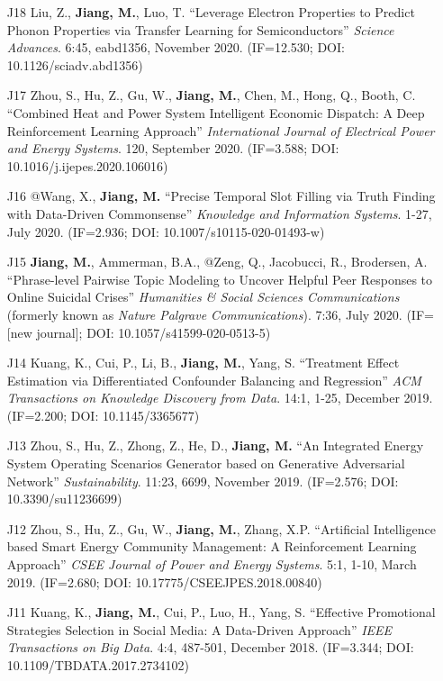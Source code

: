 \documentclass[10pt]{article}
\newenvironment{myindentpar}[1]%
{\begin{list}{}%
         {\setlength{\leftmargin}{#1}}%
         \item[]%
}
{\end{list}}
\newcounter{list}
\begin{document}
\begin{myindentpar}{0.00cm}
\begin{enumerate}[leftmargin=.5cm]
\item[J18] Liu, Z., \textbf{Jiang, M.}, Luo, T. ``Leverage Electron Properties to Predict Phonon Properties via Transfer Learning for Semiconductors'' \textit{Science Advances}. 6:45, eabd1356, November 2020. (IF=12.530; DOI: 10.1126/sciadv.abd1356)
	
\item[J17] Zhou, S., Hu, Z., Gu, W., \textbf{Jiang, M.}, Chen, M., Hong, Q., Booth, C. ``Combined Heat and Power System Intelligent Economic Dispatch: A Deep Reinforcement Learning Approach'' \textit{International Journal of Electrical Power and Energy Systems}. 120, September 2020. (IF=3.588; DOI: 10.1016/j.ijepes.2020.106016)

\item[J16] @Wang, X., \textbf{Jiang, M.} ``Precise Temporal Slot Filling via Truth Finding with Data-Driven Commonsense'' \textit{Knowledge and Information Systems}. 1-27, July 2020. (IF=2.936; DOI: 10.1007/s10115-020-01493-w)

\item[J15] \textbf{Jiang, M.}, Ammerman, B.A., @Zeng, Q., Jacobucci, R., Brodersen, A. ``Phrase-level Pairwise Topic Modeling to Uncover Helpful Peer Responses to Online Suicidal Crises'' \textit{Humanities \& Social Sciences Communications} (formerly known as \textit{Nature Palgrave Communications}). 7:36, July 2020. (IF=[new journal]; DOI: 10.1057/s41599-020-0513-5)

\item[J14] Kuang, K., Cui, P., Li, B., \textbf{Jiang, M.}, Yang, S. ``Treatment Effect Estimation via Differentiated Confounder Balancing and Regression'' \textit{ACM Transactions on Knowledge Discovery from Data}. 14:1, 1-25, December 2019. (IF=2.200; DOI: 10.1145/3365677)
	
\item[J13] Zhou, S., Hu, Z., Zhong, Z., He, D., \textbf{Jiang, M.} ``An Integrated Energy System Operating Scenarios Generator based on Generative Adversarial Network'' \textit{Sustainability}. 11:23, 6699, November 2019. (IF=2.576; DOI: 10.3390/su11236699)

\item[J12] Zhou, S., Hu, Z., Gu, W., \textbf{Jiang, M.}, Zhang, X.P. ``Artificial Intelligence based Smart Energy Community Management: A Reinforcement Learning Approach'' \textit{CSEE Journal of Power and Energy Systems}. 5:1, 1-10, March 2019. (IF=2.680; DOI: 10.17775/CSEEJPES.2018.00840)

\item[J11] Kuang, K., \textbf{Jiang, M.}, Cui, P., Luo, H., Yang, S. ``Effective Promotional Strategies Selection in Social Media: A Data-Driven Approach'' \textit{IEEE Transactions on Big Data}. 4:4, 487-501, December 2018. (IF=3.344; DOI: 10.1109/TBDATA.2017.2734102)


\end{enumerate}
\end{myindentpar}
\end{document}
